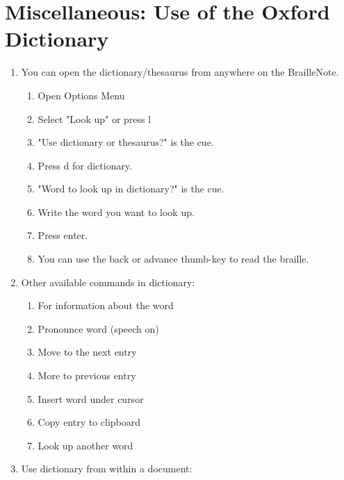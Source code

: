 \documentclass[10pt,letterpaper,twoside]{report}
\begin{document}
{{{{\section{Miscellaneous: Use of the Oxford Dictionary}
\begin{enumerate}
	\item You can open the dictionary/thesaurus from anywhere on the BrailleNote.
	      \begin{enumerate}
		      \item Open Options Menu
		      \item Select "Look up" or press l
		      \item "Use dictionary or thesaurus?" is the cue.
		      \item Press d for dictionary.
		      \item "Word to look up in dictionary?" is the cue.
		      \item Write the word you want to look up.
		      \item Press enter.
		      \item You can use the back or advance thumb-key to read the braille.
	      \end{enumerate}
	\item Other available commands in dictionary:
	      \begin{enumerate}
		      \item For information about the word 
		      \item Pronounce word (speech on) 
		      \item Move to the next entry 
		      \item More to previous entry 
		      \item Insert word under cursor 
		      \item Copy entry to clipboard 
		      \item Look up another word 
	      \end{enumerate}
	\item Use dictionary from within a document:
	      \begin{enumerate}

\end{enumerate}
\end{enumerate}}}}}
\end{document}
